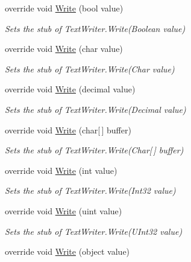 \begin{DoxyCompactItemize}
override void \hyperlink{class_system_1_1_i_o_1_1_fakes_1_1_stub_text_writer_a9ee58d3f7a9d8b411d0db775a089ceda}{Write} (bool value)
\begin{DoxyCompactList}\small\item\em Sets the stub of Text\-Writer.\-Write(\-Boolean value)\end{DoxyCompactList}\item 
override void \hyperlink{class_system_1_1_i_o_1_1_fakes_1_1_stub_text_writer_ab3094dc9da12bf68a56ae91c8a1dfc1c}{Write} (char value)
\begin{DoxyCompactList}\small\item\em Sets the stub of Text\-Writer.\-Write(\-Char value)\end{DoxyCompactList}\item 
override void \hyperlink{class_system_1_1_i_o_1_1_fakes_1_1_stub_text_writer_aae4a7185acf041bf250c1fc18984e7d2}{Write} (decimal value)
\begin{DoxyCompactList}\small\item\em Sets the stub of Text\-Writer.\-Write(\-Decimal value)\end{DoxyCompactList}\item 
override void \hyperlink{class_system_1_1_i_o_1_1_fakes_1_1_stub_text_writer_ad322e64997b0d7a053157b13353ad515}{Write} (char\mbox{[}$\,$\mbox{]} buffer)
\begin{DoxyCompactList}\small\item\em Sets the stub of Text\-Writer.\-Write(\-Char\mbox{[}$\,$\mbox{]} buffer)\end{DoxyCompactList}\item 
override void \hyperlink{class_system_1_1_i_o_1_1_fakes_1_1_stub_text_writer_aba334d27c3e3baa8bc149d27a67c2646}{Write} (int value)
\begin{DoxyCompactList}\small\item\em Sets the stub of Text\-Writer.\-Write(\-Int32 value)\end{DoxyCompactList}\item 
override void \hyperlink{class_system_1_1_i_o_1_1_fakes_1_1_stub_text_writer_ab8ced1ad56ac9e0b7b315a2b3928ddd4}{Write} (uint value)
\begin{DoxyCompactList}\small\item\em Sets the stub of Text\-Writer.\-Write(\-U\-Int32 value)\end{DoxyCompactList}\item 
override void \hyperlink{class_system_1_1_i_o_1_1_fakes_1_1_stub_text_writer_a09da9440e3e0c05653b8f285c6e10bba}{Write} (object value)

\end{DoxyCompactItemize}
